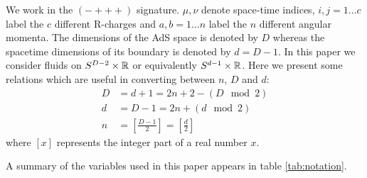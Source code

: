 \documentclass[12pt]{article}
\begin{document}
We work in the $(-+++)$ signature. $\mu,\nu$ denote space-time indices, $i,j=1 \ldots c$ label the $c$ different R-charges and $a,b=1 \ldots n$ label the $n$ different angular momenta. The dimensions of the AdS space is denoted by $D$ whereas the spacetime dimensions of its boundary is denoted by $d=D-1$. In this paper we consider fluids on $S^{D-2}\times \mathbb{R}$ or equivalently $S^{d-1}\times \mathbb{R}$. Here we present some relations which are useful in converting between $n$, $D$ and $d$:
%
\begin{equation*}
\begin{split}
 D&= d+1 = 2n+2-(D \mod 2) \\
 d&=D-1 =2n + (d \mod 2) \\
 n&=\left[\frac{D-1}{2}\right]=\left[\frac{d}{2}\right]
\end{split}
\end{equation*}
%
where $[x]$ represents the integer part of a real number $x$.

A summary of the variables used in this paper appears in table \ref{tab:notation}.
\end{document}
